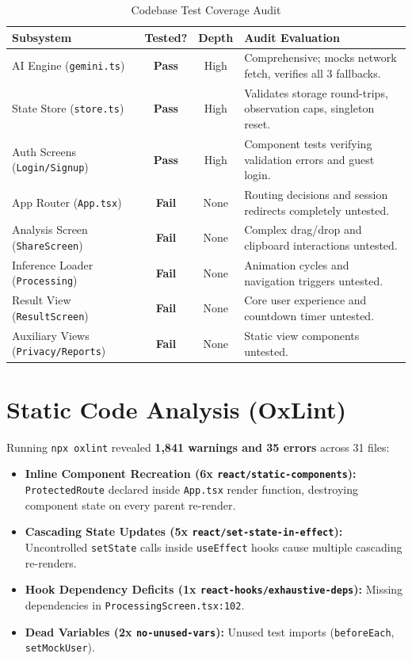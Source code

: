 \documentclass[10pt,a4paper]{report}
\newcommand{\statusPass}{\textcolor{passGreen}{\textbf{Pass}}}
\newcommand{\statusFail}{\textcolor{critRed}{\textbf{Fail}}}
\begin{document}
\begin{table}[htbp]
\centering
\small
\caption{Codebase Test Coverage Audit}
\begin{tabularx}{\textwidth}{l c c X}
\toprule
\textbf{Subsystem} & \textbf{Tested?} & \textbf{Depth} & \textbf{Audit Evaluation} \\
\midrule
AI Engine (\texttt{gemini.ts}) & \statusPass & High & Comprehensive; mocks network fetch, verifies all 3 fallbacks. \\
State Store (\texttt{store.ts}) & \statusPass & High & Validates storage round-trips, observation caps, singleton reset. \\
Auth Screens (\texttt{Login/Signup}) & \statusPass & High & Component tests verifying validation errors and guest login. \\
App Router (\texttt{App.tsx}) & \statusFail & None & Routing decisions and session redirects completely untested. \\
Analysis Screen (\texttt{ShareScreen}) & \statusFail & None & Complex drag/drop and clipboard interactions untested. \\
Inference Loader (\texttt{Processing}) & \statusFail & None & Animation cycles and navigation triggers untested. \\
Result View (\texttt{ResultScreen}) & \statusFail & None & Core user experience and countdown timer untested. \\
Auxiliary Views (\texttt{Privacy/Reports}) & \statusFail & None & Static view components untested. \\
\bottomrule
\end{tabularx}
\end{table}

\section{Static Code Analysis (OxLint)}
Running \texttt{npx oxlint} revealed \textbf{1,841 warnings and 35 errors} across 31 files:
\begin{itemize}[leftmargin=1.5em]
    \item \textbf{Inline Component Recreation (6x \texttt{react/static-components}):} \texttt{ProtectedRoute} declared inside \texttt{App.tsx} render function, destroying component state on every parent re-render.
    \item \textbf{Cascading State Updates (5x \texttt{react/set-state-in-effect}):} Uncontrolled \texttt{setState} calls inside \texttt{useEffect} hooks cause multiple cascading re-renders.
    \item \textbf{Hook Dependency Deficits (1x \texttt{react-hooks/exhaustive-deps}):} Missing dependencies in \texttt{ProcessingScreen.tsx:102}.
    \item \textbf{Dead Variables (2x \texttt{no-unused-vars}):} Unused test imports (\texttt{beforeEach}, \texttt{setMockUser}).
\end{itemize}
\end{document}
